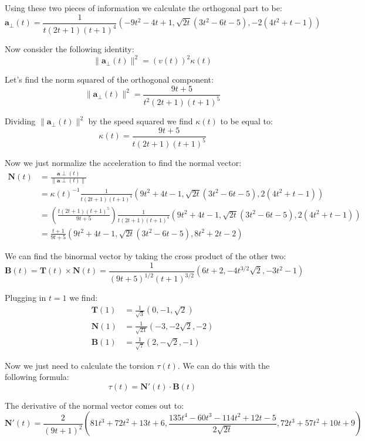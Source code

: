 \documentclass{article}
\begin{document}
Using these two pieces of information we calculate the orthogonal part to be:
$$\mathbf a_\perp(t)=\frac{1}{t(2t+1)(t+1)^4}(-9t^2-4t+1,\sqrt{2t}(3t^2-6t-5),-2(4t^2+t-1))$$

Now consider the following identity:
$$\|\mathbf a_\perp(t)\|^2=(v(t))^2\kappa(t)$$

Let's find the norm squared of the orthogonal component:
$$\|\mathbf a_\perp(t)\|^2=\frac{9t+5}{t^2(2t+1)(t+1)^5}$$

%
%

Dividing $\|\mathbf a_\perp(t)\|^2$ by the speed squared we find $\kappa(t)$ to be equal to:
$$\kappa(t)=\frac{9t+5}{t(2t+1)(t+1)^5}$$

Now we just normalize the acceleration to find the normal vector:
\begin{align*}
  \mathbf N(t)&=\frac{\mathbf a\perp(t)}{\|\mathbf a\perp(t)\|}\\
  &=\kappa(t)^{-1}\frac{1}{t(2t+1)(t+1)^4}(9t^2+4t-1,\sqrt{2t}(3t^2-6t-5),2(4t^2+t-1))\\
  &=\left(\frac{t(2t+1)(t+1)^5}{9t+5}\right)\frac{1}{t(2t+1)(t+1)^4}(9t^2+4t-1,\sqrt{2t}(3t^2-6t-5),2(4t^2+t-1))\\
  &=\frac{t+1}{9t+5}(9t^2+4t-1,\sqrt{2t}(3t^2-6t-5),8t^2+2t-2)
\end{align*}

We can find the binormal vector by taking the cross product of the other two:
$$\mathbf B(t)=\mathbf T(t)\times\mathbf N(t)=\frac{1}{(9t+5)^{1/2}(t+1)^{3/2}}(6t+2,-4t^{3/2}\sqrt 2,-3t^2-1)$$

Plugging in $t=1$ we find:
\begin{align*}
  \mathbf T(1)&=\frac{1}{\sqrt 3}(0,-1,\sqrt 2)\\
  \mathbf N(1)&=\frac{1}{\sqrt{21}}(-3,-2\sqrt 2,-2)\\
  \mathbf B(1)&=\frac{1}{\sqrt{7}}(2,-\sqrt 2,-1)
\end{align*}

Now we just need to calculate the torsion $\tau(t)$. We can do this with the following formula:
$$\tau(t)=\mathbf N'(t)\cdot\mathbf B(t)$$

The derivative of the normal vector comes out to:
$$\mathbf N'(t)=\frac{2}{(9t+1)^2}\left(81t^3+72t^2+13t+6,\frac{135t^4-60t^3-114t^2+12t-5}{2\sqrt {2t}},72t^3+57t^2+10t+9\right)$$
\end{document}
